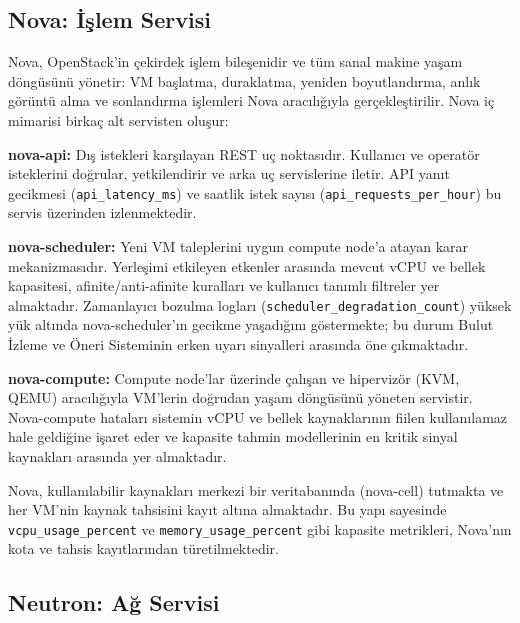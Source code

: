 \subsection{Nova: İşlem Servisi}

Nova, OpenStack'in çekirdek işlem bileşenidir ve tüm sanal makine yaşam döngüsünü yönetir: VM başlatma, duraklatma, yeniden boyutlandırma, anlık görüntü alma ve sonlandırma işlemleri Nova aracılığıyla gerçekleştirilir.
Nova iç mimarisi birkaç alt servisten oluşur:

\begin{maddelendir}[label=--]
    \item \textbf{nova-api:} Dış istekleri karşılayan REST uç noktasıdır.
    Kullanıcı ve operatör isteklerini doğrular, yetkilendirir ve arka uç servislerine iletir.
    API yanıt gecikmesi (\texttt{api\_latency\_ms}) ve saatlik istek sayısı (\texttt{api\_requests\_per\_hour}) bu servis üzerinden izlenmektedir.

    \item \textbf{nova-scheduler:} Yeni VM taleplerini uygun compute node'a atayan karar mekanizmasıdır.
    Yerleşimi etkileyen etkenler arasında mevcut vCPU ve bellek kapasitesi, afinite/anti-afinite kuralları ve kullanıcı tanımlı filtreler yer almaktadır.
    Zamanlayıcı bozulma logları (\texttt{scheduler\_degradation\_count}) yüksek yük altında nova-scheduler'ın gecikme yaşadığını göstermekte; bu durum Bulut İzleme ve Öneri Sisteminin erken uyarı sinyalleri arasında öne çıkmaktadır.

    \item \textbf{nova-compute:} Compute node'lar üzerinde çalışan ve hipervizör (KVM, QEMU) aracılığıyla VM'lerin doğrudan yaşam döngüsünü yöneten servistir.
    Nova-compute hataları sistemin vCPU ve bellek kaynaklarının fiilen kullanılamaz hale geldiğine işaret eder ve kapasite tahmin modellerinin en kritik sinyal kaynakları arasında yer almaktadır.
\end{maddelendir}

Nova, kullanılabilir kaynakları merkezi bir veritabanında (nova-cell) tutmakta ve her VM'nin kaynak tahsisini kayıt altına almaktadır.
Bu yapı sayesinde \texttt{vcpu\_usage\_percent} ve \texttt{memory\_usage\_percent} gibi kapasite metrikleri, Nova'nın kota ve tahsis kayıtlarından türetilmektedir.

\subsection{Neutron: Ağ Servisi}


